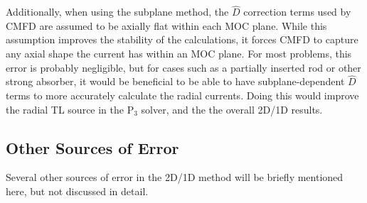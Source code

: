 Additionally, when using the subplane method, the $\hat{D}$ correction terms used by CMFD are assumed to be axially flat within each MOC plane.  While this assumption improves the stability of the calculations, it forces CMFD to capture any axial shape the current has within an MOC plane.  For most problems, this error is probably negligible, but for cases such as a partially inserted rod or other strong absorber, it would be beneficial to be able to have subplane-dependent $\hat{D}$ terms to more accurately calculate the radial currents.  Doing this would improve the radial TL source in the P$_3$ solver, and the the overall 2D/1D results.

\subsection{Other Sources of Error}

Several other sources of error in the 2D/1D method will be briefly mentioned here, but not discussed in detail.

